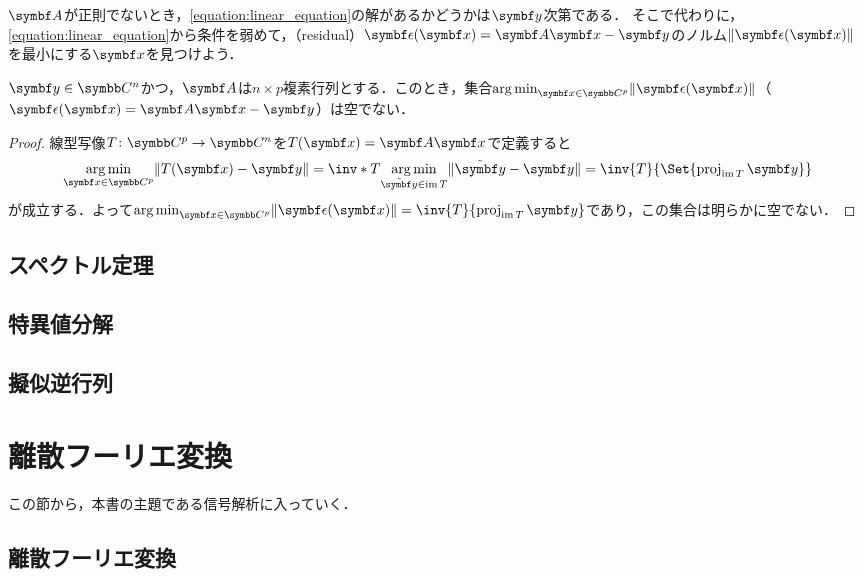 \documentclass[../../main]{subfiles}
\begin{document}
\(\mat{A}\)が正則でないとき，\cref{equation:linear_equation}の解があるかどうかは\(\vect{y}\)次第である．
そこで代わりに，\cref{equation:linear_equation}から条件を弱めて，（residual）\(\vect{\epsilon}(\vect{x})=\mat{A}\vect{x}-\vect{y}\)のノルム\(\vnorm{\vect{\epsilon(\vect{x})}}\)を最小にする\(\vect{x}\)を見つけよう．

\begin{proposition}{}{}
  \(\vect{y}\in\numset{C}^n\)かつ，\(\mat{A}\)は\(n\times p\)複素行列とする．このとき，集合\(\argmin_{\vect{x}\in\numset{C}^p}\vnorm{\vect{\epsilon}(\vect{x})}\)（\(\vect{\epsilon}(\vect{x})=\mat{A}\vect{x}-\vect{y}\)）は空でない．
\end{proposition}

\begin{proof}
  線型写像\(T\colon\numset{C}^p\to\numset{C}^n\)を\(T(\vect{x})=\mat{A}\vect{x}\)で定義すると
  \[
    \argmin_{\vect{x}\in\numset{C}^p}\vnorm{T(\vect{x})-\vect{y}} = \inv*{T}{\argmin_{\tilde{\vect{y}}\in\img T}\vnorm{\tilde{\vect{y}}-\vect{y}}}
    = \inv{T}{\Set{\proj_{\img T}\vect{y}}}
  \]
  が成立する．よって\(\argmin_{\vect{x}\in\numset{C}^p}\vnorm{\vect{\epsilon}(\vect{x})}=\inv{T}{\proj_{\img T}\vect{y}}\)であり，この集合は明らかに空でない．
\end{proof}

\subsection{スペクトル定理}

\subsection{特異値分解}

\subsection{擬似逆行列}

\section{離散フーリエ変換}

この節から，本書の主題である信号解析に入っていく．

\subsection{離散フーリエ変換}
\end{document}
